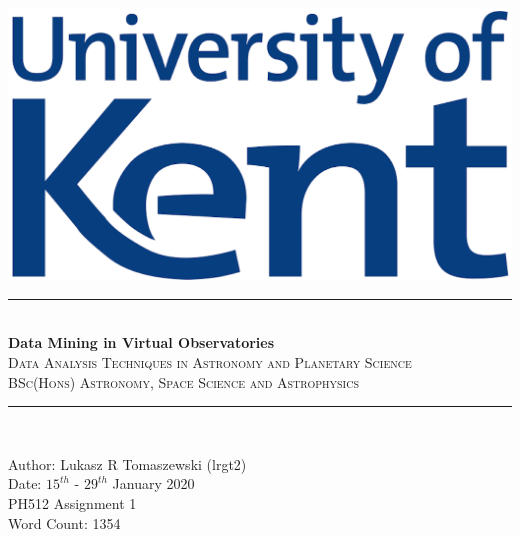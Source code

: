 \documentclass[12pt]{article}
\title{}
\begin{document}
\begin{titlepage}
\newcommand{\HRule}{\rule{\linewidth}{0.5mm}}
\begin{centering} 

\includegraphics[scale=0.7]{Images/Uni_of_Kent.png}\\[1cm]
\HRule \\[0.4cm]
\Huge{\bfseries{Data Mining in Virtual Observatories}}\\[0.1cm]
\textsc{\large Data Analysis Techniques in Astronomy and Planetary Science}\\[0.1cm]
\textsc{\large BSc(Hons) Astronomy, Space Science and Astrophysics}\\[0.1cm]
\HRule \\[0.5cm]
\begin{minipage}{0.625\textwidth}
\begin{center} \large
{\large Author: Lukasz R Tomaszewski (lrgt2)} \\[0.2cm]
{\large Date: $15^{th}$ - $29^{th}$ January 2020}\\[0.2cm]
{\large PH512 Assignment 1} \\[0.2cm]
{\large Word Count: 1354} \\
\end{center}
\end{minipage}\\[1cm]
\end{centering} 
\begin{tableofcontents}
\end{tableofcontents}
\end{titlepage}
\newpage
\end{document}
